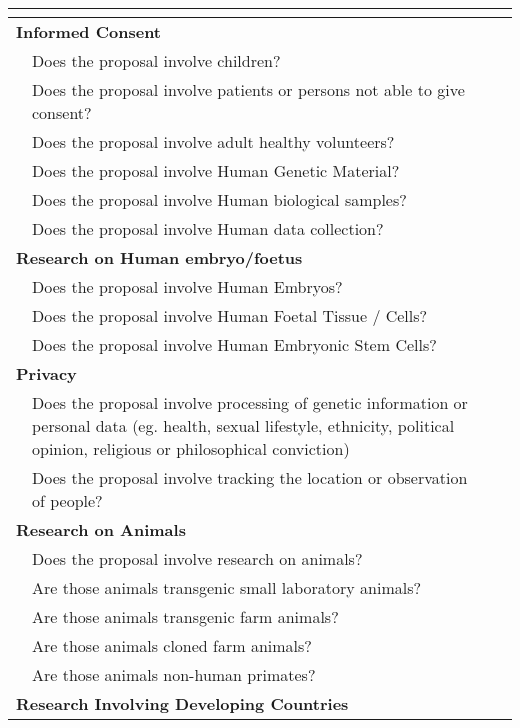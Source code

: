 \begin{small}
\begin{tabular}{|p{1em}p{11cm}|l|l|}\hline
  \multicolumn{2}{|l|}{\cellcolor{lightgray}{\strut}} & 
  \cellcolor{lightgray}{YES} & 
  \cellcolor{lightgray}{PAGE}\\\hline 
  \multicolumn{2}{|l|}{\bf{Informed Consent}} & & \\\hline
  & Does the proposal involve children?  & & \\\hline
  & Does the proposal involve patients or persons not able to give consent? & & \\\hline
  & Does the proposal involve adult healthy volunteers? & & \\\hline
  & Does the proposal involve Human Genetic Material? & & \\\hline
  & Does the proposal involve Human biological samples? & & \\\hline
  & Does the proposal involve Human data collection? & & \\\hline
  \multicolumn{2}{|l|}{\bf{Research on Human embryo/foetus}}  & & \\\hline
  & Does the proposal involve Human Embryos? & & \\\hline
  & Does the proposal involve Human Foetal Tissue / Cells? & & \\\hline
  & Does the proposal involve Human Embryonic Stem Cells? & & \\\hline
  \multicolumn{2}{|l|}{\bf{Privacy}} & & \\\hline
  & Does the proposal involve processing of genetic information 
         or personal data (eg. health, sexual lifestyle, ethnicity, 
         political opinion, religious or philosophical conviction)  & & \\\hline 
  & Does the proposal involve tracking the location or observation 
         of people? & & \\\hline 
  \multicolumn{2}{|l|}{\bf{Research on Animals}} & & \\\hline 
  & Does the proposal involve research on animals? & & \\\hline 
  & Are those animals transgenic small laboratory animals? & & \\\hline 
  & Are those animals transgenic farm animals? & & \\\hline 
  & Are those animals cloned farm animals? & & \\\hline 
  & Are those animals non-human primates?  & & \\\hline 
  \multicolumn{2}{|l|}{\bf{Research Involving Developing Countries}} & & \\\hline 

\end{tabular}
\end{small}
